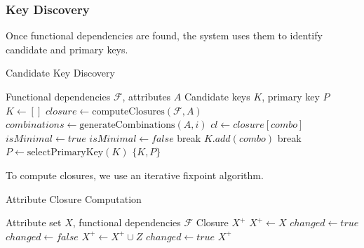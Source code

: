 \documentclass[sigconf]{acmart}
\begin{document}
\subsubsection{Key Discovery}

Once functional dependencies are found, the system uses them to identify candidate and primary keys.

\begin{algorithm}
\caption{Candidate Key Discovery}
\label{alg:key-discovery}
\begin{algorithmic}[1]
\REQUIRE Functional dependencies $\mathcal{F}$, attributes $A$
\ENSURE Candidate keys $K$, primary key $P$
\STATE $K \leftarrow []$
\STATE $closure \leftarrow \text{computeClosures}(\mathcal{F}, A)$
    \STATE $combinations \leftarrow 
    \text{generateCombinations}(A, i)$
        \STATE $cl \leftarrow closure[combo]$
            \STATE $isMinimal \leftarrow true$
                    \STATE $isMinimal \leftarrow false$
                    \STATE break
                \ENDIF
            \ENDFOR
                \STATE $K.add(combo)$
            \ENDIF
        \ENDIF
    \ENDFOR
        \STATE break 
    \ENDIF
\ENDFOR
\STATE $P \leftarrow \text{selectPrimaryKey}(K)$
\STATE \RETURN $\{K, P\}$
\end{algorithmic}
\end{algorithm}

To compute closures, we use an iterative fixpoint algorithm.

\begin{algorithm}
\caption{Attribute Closure Computation}
\label{alg:closure-compute}
\begin{algorithmic}[1]
\REQUIRE Attribute set $X$, functional dependencies $\mathcal{F}$
\ENSURE Closure $X^+$
\STATE $X^+ \leftarrow X$
\STATE $changed \leftarrow true$
    \STATE $changed \leftarrow false$
            \STATE $X^+ \leftarrow X^+ \cup Z$
            \STATE $changed \leftarrow true$
        \ENDIF
    \ENDFOR
\ENDWHILE
\STATE \RETURN $X^+$
\end{algorithmic}
\end{algorithm}
\end{document}
